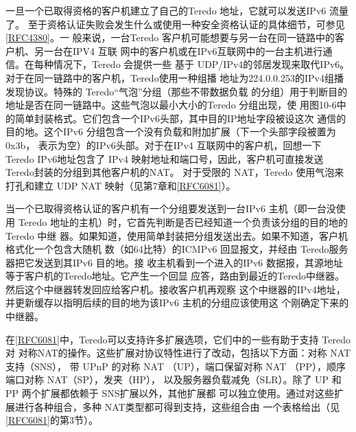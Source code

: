 一旦一个已取得资格的客户机建立了自己的Teredo 地址，它就可以发送IPv6 流量了。
至于资格认证失败会发生什么或使用一种安全资格认证的具体细节，可参见\href{https://www.rfc-editor.org/rfc/rfc4380}{[RFC4380]}。一
般来说，一台Teredo 客户机可能想要与另一台在同一链路中的客户机、另一台在IPV4 互联
网中的客户机或在IPv6互联网中的一台主机进行通信。在每种情况下，Teredo 会提供一些
基于 UDP/IPv4的邻居发现来取代IPv6。对于在同一链路中的客户机，Teredo使用一种组播
地址为224.0.0.253的IPv4组播发现协议。特殊的 Teredo“气泡”分组（那些不带数据负载
的分组）用于判断目的地址是否在同一链路中。这些气泡以最小大小的Teredo 分组出现，使
用图10-6中的简单封装格式。它们包含一个IPv6头部，其中目的IP地址字段被设这次
通信的目的地。这个IPv6 分组包含一个没有负载和附加扩展（下一个头部字段被置为0x3b，
表示为空）的IPv6头部。对于在IPv4 互联网中的客户机，回想一下 Teredo IPv6地址包含了
IPv4 映射地址和端口号，因此，客户机可直接发送Teredo封装的分组到其他客户机的NAT。
对于受限的 NAT，Teredo 使用气泡来打孔和建立 UDP NAT
映射（见第7章和\href{https://www.rfc-editor.org/rfc/rfc6081}{[RFC6081]}）。

当一个已取得资格认证的客户机有一个分组要发送到一台IPv6 主机（即一台没使用
Teredo 地址的主机）时，它首先判断是否已经知道一个负责该分组的目的地的Teredo 中继
器。如果知道，使用简单封装把分组发送出去。如果不知道，客户机格式化一个包含大随机
数（如64比特）的ICMPv6 回显报文，并经由 Teredo服务器把它发送到其IPv6 目的地。接
收主机看到一个进入的IPv6 数据报，其源地址等于客户机的Teredo地址。它产生一个回显
应答，路由到最近的Teredo中继器。然后这个中继器转发回应给客户机。接收客户机再观察
这个中继器的IPv4地址，并更新缓存以指明后续的目的地为该IPv6 主机的分组应该使用这
个刚确定下来的中继器。

在\href{https://www.rfc-editor.org/rfc/rfc6081}{[RFC6081]}中，Teredo可以支持许多扩展选项，它们中的一些有助于支持
Teredo对
对称NAT的操作。这些扩展对协议特性进行了改动，包括以下方面：对称 NAT 支持（SNS），
带 UPnP 的对称 NAT （UP），端口保留对称 NAT （PP），顺序端口对称 NAT（SP），发夹（HP），
以及服务器负载减免（SLR）。除了 UP 和PP 两个扩展都依赖于 SNS扩展以外，其他扩展都
可以独立使用。通过对这些扩展进行各种组合，多种 NAT类型都可得到支持，这些组合由
一个表格给出（见\href{https://www.rfc-editor.org/rfc/rfc6081}{[RFC6081]}的第3节）。

